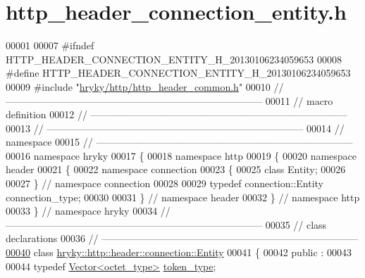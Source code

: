 \hypertarget{http__header__connection__entity_8h_source}{\section{http\-\_\-header\-\_\-connection\-\_\-entity.\-h}
}

\begin{DoxyCode}
00001 
00007 \textcolor{preprocessor}{#ifndef HTTP\_HEADER\_CONNECTION\_ENTITY\_H\_20130106234059653}
00008 \textcolor{preprocessor}{}\textcolor{preprocessor}{#define HTTP\_HEADER\_CONNECTION\_ENTITY\_H\_20130106234059653}
00009 \textcolor{preprocessor}{}\textcolor{preprocessor}{#include "\hyperlink{http__header__common_8h}{hryky/http/http_header_common.h}"}
00010 \textcolor{comment}{//
      ------------------------------------------------------------------------------}
00011 \textcolor{comment}{// macro definition}
00012 \textcolor{comment}{//
      ------------------------------------------------------------------------------}
00013 \textcolor{comment}{//
      ------------------------------------------------------------------------------}
00014 \textcolor{comment}{// namespace}
00015 \textcolor{comment}{//
      ------------------------------------------------------------------------------}
00016 \textcolor{keyword}{namespace }hryky
00017 \{
00018 \textcolor{keyword}{namespace }http
00019 \{
00020 \textcolor{keyword}{namespace }header
00021 \{
00022 \textcolor{keyword}{namespace }connection
00023 \{
00025     \textcolor{keyword}{class }Entity;
00026 
00027 \} \textcolor{comment}{// namespace connection}
00028 
00029 \textcolor{keyword}{typedef} connection::Entity connection\_type;
00030 
00031 \} \textcolor{comment}{// namespace header}
00032 \} \textcolor{comment}{// namespace http}
00033 \} \textcolor{comment}{// namespace hryky}
00034 \textcolor{comment}{//
      ------------------------------------------------------------------------------}
00035 \textcolor{comment}{// class declarations}
00036 \textcolor{comment}{//
      ------------------------------------------------------------------------------}
\hypertarget{http__header__connection__entity_8h_source_l00040}{}\hyperlink{classhryky_1_1http_1_1header_1_1connection_1_1_entity}{00040} \textcolor{comment}{}\textcolor{keyword}{class }\hyperlink{classhryky_1_1http_1_1header_1_1connection_1_1_entity}{hryky::http::header::connection::Entity}
00041 \{
00042 \textcolor{keyword}{public} :
00043 
00044     \textcolor{keyword}{typedef} \hyperlink{classhryky_1_1_vector}{Vector<octet_type>} \hyperlink{classhryky_1_1_vector}{token_type};

\end{DoxyCode}
